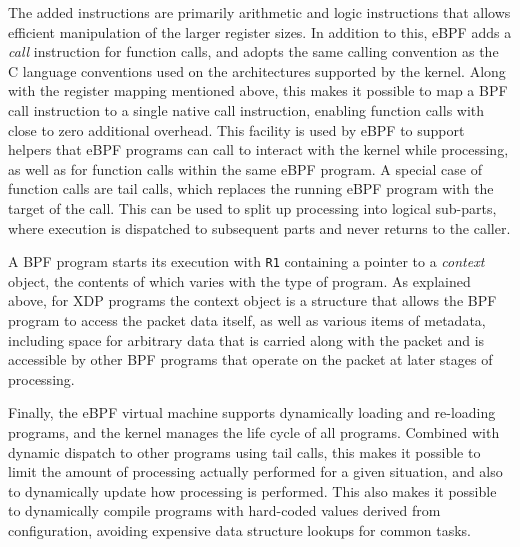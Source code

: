 \documentclass[10pt,sigconf]{acmart}
\begin{document}
The added instructions are primarily arithmetic and logic instructions that
allows efficient manipulation of the larger register sizes. In addition to this,
eBPF adds a \emph{call} instruction for function calls, and adopts the same
calling convention as the C language conventions used on the architectures
supported by the kernel. Along with the register mapping mentioned above, this
makes it possible to map a BPF call instruction to a single native call
instruction, enabling function calls with close to zero additional overhead.
This facility is used by eBPF to support helpers that eBPF programs can call to
interact with the kernel while processing, as well as for function calls within
the same eBPF program. A special case of function calls are tail calls, which
replaces the running eBPF program with the target of the call. This can be used
to split up processing into logical sub-parts, where execution is dispatched to
subsequent parts and never returns to the caller.

A BPF program starts its execution with \texttt{R1} containing a pointer to a
\emph{context} object, the contents of which varies with the type of program. As
explained above, for XDP programs the context object is a structure that allows
the BPF program to access the packet data itself, as well as various items of
metadata, including space for arbitrary data that is carried along with the
packet and is accessible by other BPF programs that operate on the packet at
later stages of processing.

Finally, the eBPF virtual machine supports dynamically loading and re-loading
programs, and the kernel manages the life cycle of all programs. Combined with
dynamic dispatch to other programs using tail calls, this makes it possible to
limit the amount of processing actually performed for a given situation, and
also to dynamically update how processing is performed. This also makes it
possible to dynamically compile programs with hard-coded values derived from
configuration, avoiding expensive data structure lookups for common tasks.
\end{document}
